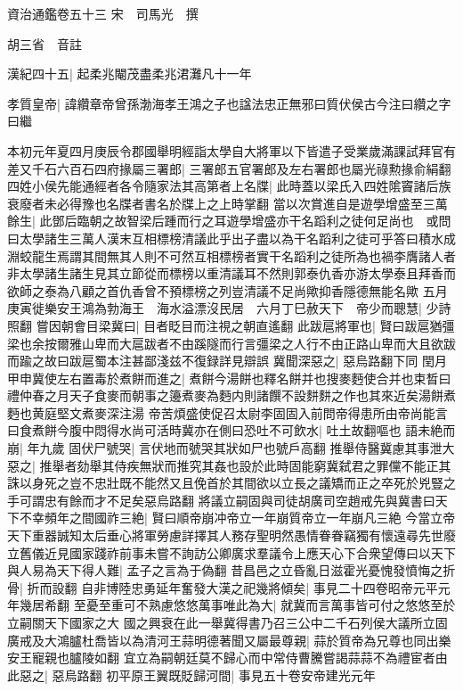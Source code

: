 資治通鑑卷五十三
宋　司馬光　撰

胡三省　音註

漢紀四十五|{
	起柔兆閹茂盡柔兆涒灘凡十一年}


孝質皇帝|{
	諱纘章帝曾孫渤海孝王鴻之子也諡法忠正無邪曰質伏侯古今注曰纘之字曰繼}


本初元年夏四月庚辰令郡國舉明經詣太學自大將軍以下皆遣子受業歲滿課試拜官有差又千石六百石四府掾屬三署郎|{
	三署郎五官署郎及左右署郎也屬光祿勲掾俞絹翻}
四姓小侯先能通經者各令隨家法其高第者上名牒|{
	此時蓋以梁氏入四姓隂竇諸后族衰廢者未必得豫也名牒者書名於牒上之上時掌翻}
當以次賞進自是遊學增盛至三萬餘生|{
	此鄧后臨朝之故智梁后踵而行之耳遊學增盛亦干名蹈利之徒何足尚也　或問曰太學諸生三萬人漢末互相標榜清議此乎出子盡以為干名蹈利之徒可乎答曰積水成淵蛟龍生焉謂其間無其人則不可然互相標榜者實干名蹈利之徒所為也禍李膺諸人者非太學諸生諸生見其立節從而標榜以重清議耳不然則郭泰仇香亦游太學泰且拜香而欲師之泰為八顧之首仇香曾不預標榜之列豈清議不足尚歟抑香隱德無能名歟}
五月庚寅徙樂安王鴻為勃海王　海水溢漂沒民居　六月丁巳赦天下　帝少而聰慧|{
	少詩照翻}
嘗因朝會目梁冀曰|{
	目者眨目而注視之朝直遙翻}
此跋扈將軍也|{
	賢曰跋扈猶彊梁也余按爾雅山卑而大扈跋者不由蹊隧而行言彊梁之人行不由正路山卑而大且欲跋而踰之故曰跋扈蜀本注甚鄙淺兹不復録詳見辯誤}
冀聞深惡之|{
	惡烏路翻下同}
閏月甲申冀使左右置毒於煮餅而進之|{
	煮餅今湯餅也釋名餅并也搜麥麪使合并也束晳曰禮仲春之月天子食麥而朝事之籩煮麥為麪内則諸饌不設䴵䴵之作也其來近矣湯餅煮麪也黄庭堅文煮麥深注湯}
帝苦煩盛使促召太尉李固固入前問帝得患所由帝尚能言曰食煮餅今腹中悶得水尚可活時冀亦在側曰恐吐不可飲水|{
	吐土故翻嘔也}
語未絶而崩|{
	年九歲}
固伏尸號哭|{
	言伏地而號哭其狀如尸也號戶高翻}
推舉侍醫冀慮其事泄大惡之|{
	推舉者劾舉其侍疾無狀而推究其姦也設於此時固能窮冀弑君之罪儻不能正其誅以身死之豈不忠壯既不能然又且俛首於其間欲以立長之議矯而正之卒死於兇豎之手可謂忠有餘而才不足矣惡烏路翻}
將議立嗣固與司徒胡廣司空趙戒先與冀書曰天下不幸頻年之間國祚三絶|{
	賢曰順帝崩冲帝立一年崩質帝立一年崩凡三絶}
今當立帝天下重器誠知太后垂心將軍勞慮詳擇其人務存聖明然愚情眷眷竊獨有懷遠尋先世廢立舊儀近見國家踐祚前事未嘗不詢訪公卿廣求羣議令上應天心下合衆望傳曰以天下與人易為天下得人難|{
	孟子之言為于偽翻}
昔昌邑之立昏亂日滋霍光憂愧發憤悔之折骨|{
	折而設翻}
自非博陸忠勇延年奮發大漢之祀幾將傾矣|{
	事見二十四卷昭帝元平元年幾居希翻}
至憂至重可不熟慮悠悠萬事唯此為大|{
	就冀而言萬事皆可付之悠悠至於立嗣關天下國家之大}
國之興衰在此一舉冀得書乃召三公中二千石列侯大議所立固廣戒及大鴻臚杜喬皆以為清河王蒜明德著聞又屬最尊親|{
	蒜於質帝為兄尊也同出樂安王寵親也臚陵如翻}
宜立為嗣朝廷莫不歸心而中常侍曹騰嘗謁蒜蒜不為禮宦者由此惡之|{
	惡烏路翻}
初平原王翼既貶歸河間|{
	事見五十卷安帝建光元年}
